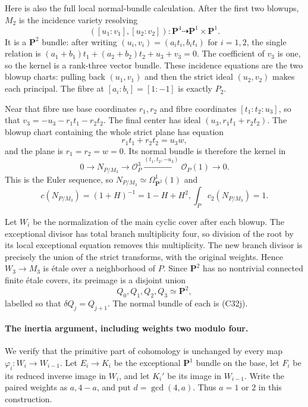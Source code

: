 Here is also the full local normal-bundle
calculation.  After the first two blowups,
$M_2$ is the incidence variety resolving
\[
        ([u_1:v_1],[u_2:v_2]):\mathbf P^4
                                         \dashrightarrow\mathbf P^1\times\mathbf P^1.
\]
It is a $\mathbf P^2$ bundle: after writing
$(u_i,v_i)=(a_i t_i,b_i t_i)$ for $i=1,2$,
the single relation is
$(a_1+b_1)t_1+(a_2+b_2)t_2+u_3+v_3=0$.
The coefficient of $v_3$ is one, so the kernel
is a rank-three vector bundle.  These incidence
equations are the two blowup charts: pulling
back $(u_1,v_1)$ and then the strict ideal
$(u_2,v_2)$ makes each principal.  The fibre at
$[a_i:b_i]=[1:-1]$ is exactly $P_2$.

Near that fibre use base coordinates $r_1,r_2$
and fibre coordinates $[t_1:t_2:u_3]$, so that
$v_3=-u_3-r_1t_1-r_2t_2$.  The final center has
ideal $(u_3,r_1t_1+r_2t_2)$.  The blowup chart
containing the whole strict plane has equation
\[
                    r_1t_1+r_2t_2=u_3w,
\]
and the plane is $r_1=r_2=w=0$.  Its normal
bundle is therefore the kernel in
\[
 0\longrightarrow N_{P/M_3}\longrightarrow
 \mathcal O_P^3
 \xrightarrow{(t_1,t_2,-u_3)}\mathcal O_P(1)
 \longrightarrow0.
                                                        \tag{C32j}
\]
This is the Euler sequence, so
$N_{P/M_3}\simeq\Omega^1_{\mathbf P^2}(1)$ and
\[
 c(N_{P/M_3})=(1+H)^{-1}=1-H+H^2,
                    \int_P c_2(N_{P/M_3})=1.
                                                        \tag{C32k}
\]

Let $W_i$ be the normalization of the main cyclic
cover after each blowup.  The exceptional divisor
has total branch multiplicity four, so division
of the root by its local exceptional equation
removes this multiplicity.  The new branch
divisor is precisely the union of the strict
transforms, with the original weights.  Hence
$W_3\to M_3$ is \'etale over a neighborhood of
$P$.  Since $\mathbf P^2$ has no nontrivial
connected finite \'etale covers, its preimage
is a disjoint union
\[
                      Q_0,Q_1,Q_2,Q_3\simeq\mathbf P^2,
\]
labelled so that $\delta Q_j=Q_{j+1}$.
The normal bundle of each is (C32j).

\paragraph{The inertia argument, including weights two modulo four.}
We verify that the primitive part of cohomology is
unchanged by every map $\varphi_i:W_i\to W_{i-1}$.
Let $E_i\to K_i$ be the exceptional $\mathbf P^1$
bundle on the base, let $F_i$ be its reduced
inverse image in $W_i$, and let $K_i'$ be its
image in $W_{i-1}$.  Write the paired weights
as $a,4-a$, and put $d=\gcd(4,a)$.  Thus
$a=1$ or $2$ in this construction.

